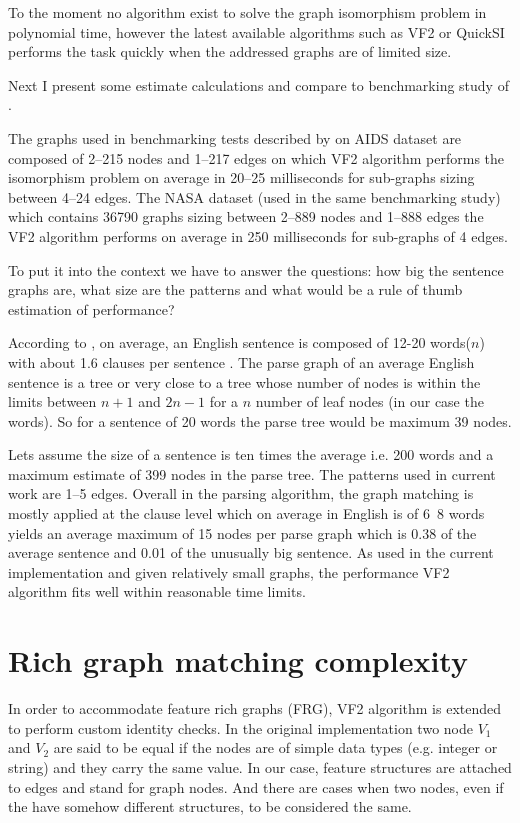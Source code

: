 To the moment no algorithm exist to solve the graph isomorphism problem in polynomial time, however the latest available algorithms such as VF2 \cite{Cordella2001,Cordella2004} or QuickSI \cite{Shang2008} performs the task quickly when the addressed graphs are of limited size. 

Next I present some estimate calculations and compare to benchmarking study of \citet{Lee2013}.

The graphs used in benchmarking tests described by \citep{Lee2013} on AIDS dataset are composed of 2--215 nodes and 1--217 edges on which VF2 algorithm performs the isomorphism problem on average in 20--25 milliseconds for sub-graphs sizing between 4--24 edges. The NASA dataset (used in the same benchmarking study) which contains 36790 graphs sizing between 2--889 nodes and 1--888 edges the VF2 algorithm performs on average in 250 milliseconds for sub-graphs of 4 edges.

To put it into the context we have to answer the questions: how big the sentence graphs are, what size are the patterns and what would be a rule of thumb estimation of performance?

According to \citep{Koeva2012}, on average, an English sentence is composed of 12-20 words($n$) with about 1.6 clauses per sentence . %
The parse graph of an average English sentence is a tree or very close to a tree whose number of nodes is within the limits between $n+1$ and $2n-1$ for a $n$ number of leaf nodes (in our case the words). So for a sentence of 20 words the parse tree would be maximum 39 nodes.

Lets assume the size of a sentence is ten times the average i.e. 200 words and a maximum estimate of 399 nodes in the parse tree. The patterns used in current work are 1--5 edges. Overall in the parsing algorithm, the graph matching is mostly applied at the clause level which on average in English is of 6~8 words yields an average maximum of 15 nodes per parse graph which is 0.38 of the average sentence and 0.01 of the unusually big sentence.
As used in the current implementation and given relatively small graphs, the performance VF2 algorithm fits well within reasonable time limits.


\section{Rich graph matching complexity}
\label{sec:rich-graph-matching}
In order to accommodate feature rich graphs (FRG), VF2 algorithm is extended to perform custom identity checks. In the original implementation two node $V_{1}$ and $V_{2}$ are said to be equal if the nodes are of simple data types (e.g. integer or string) and they carry the same value. In our case, feature structures are attached to edges and stand for graph nodes. And there are cases when two nodes, even if the have somehow different structures, to be considered the same. 

